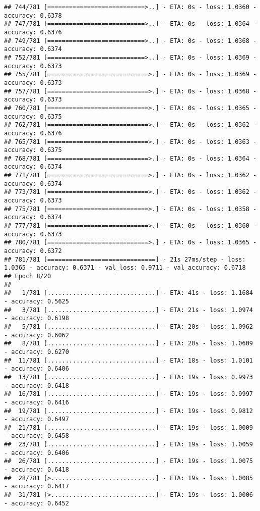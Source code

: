 \documentclass[
]{article}
\begin{document}
\begin{verbatim}
## 744/781 [===========================>..] - ETA: 0s - loss: 1.0360 - accuracy: 0.6378
## 747/781 [===========================>..] - ETA: 0s - loss: 1.0364 - accuracy: 0.6376
## 749/781 [===========================>..] - ETA: 0s - loss: 1.0368 - accuracy: 0.6374
## 752/781 [===========================>..] - ETA: 0s - loss: 1.0369 - accuracy: 0.6373
## 755/781 [============================>.] - ETA: 0s - loss: 1.0369 - accuracy: 0.6373
## 757/781 [============================>.] - ETA: 0s - loss: 1.0368 - accuracy: 0.6373
## 760/781 [============================>.] - ETA: 0s - loss: 1.0365 - accuracy: 0.6375
## 762/781 [============================>.] - ETA: 0s - loss: 1.0362 - accuracy: 0.6376
## 765/781 [============================>.] - ETA: 0s - loss: 1.0363 - accuracy: 0.6375
## 768/781 [============================>.] - ETA: 0s - loss: 1.0364 - accuracy: 0.6374
## 771/781 [============================>.] - ETA: 0s - loss: 1.0362 - accuracy: 0.6374
## 773/781 [============================>.] - ETA: 0s - loss: 1.0362 - accuracy: 0.6373
## 775/781 [============================>.] - ETA: 0s - loss: 1.0358 - accuracy: 0.6374
## 777/781 [============================>.] - ETA: 0s - loss: 1.0360 - accuracy: 0.6373
## 780/781 [============================>.] - ETA: 0s - loss: 1.0365 - accuracy: 0.6372
## 781/781 [==============================] - 21s 27ms/step - loss: 1.0365 - accuracy: 0.6371 - val_loss: 0.9711 - val_accuracy: 0.6718
## Epoch 8/20
## 
##   1/781 [..............................] - ETA: 41s - loss: 1.1684 - accuracy: 0.5625
##   3/781 [..............................] - ETA: 21s - loss: 1.0974 - accuracy: 0.6198
##   5/781 [..............................] - ETA: 20s - loss: 1.0962 - accuracy: 0.6062
##   8/781 [..............................] - ETA: 20s - loss: 1.0609 - accuracy: 0.6270
##  11/781 [..............................] - ETA: 18s - loss: 1.0101 - accuracy: 0.6406
##  13/781 [..............................] - ETA: 19s - loss: 0.9973 - accuracy: 0.6418
##  16/781 [..............................] - ETA: 19s - loss: 0.9997 - accuracy: 0.6416
##  19/781 [..............................] - ETA: 19s - loss: 0.9812 - accuracy: 0.6497
##  21/781 [..............................] - ETA: 19s - loss: 1.0009 - accuracy: 0.6458
##  23/781 [..............................] - ETA: 19s - loss: 1.0059 - accuracy: 0.6406
##  26/781 [..............................] - ETA: 19s - loss: 1.0075 - accuracy: 0.6418
##  28/781 [>.............................] - ETA: 19s - loss: 1.0085 - accuracy: 0.6417
##  31/781 [>.............................] - ETA: 19s - loss: 1.0006 - accuracy: 0.6452

\end{verbatim}
\end{document}
